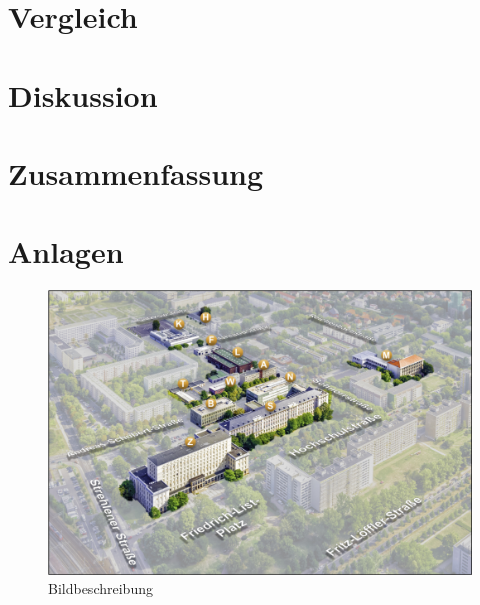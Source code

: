 \documentclass[
 openright,
 a4paper
]{scrreprt}
\begin{document}
\chapter{Vergleich}

\chapter{Diskussion}

\chapter{Zusammenfassung}

\nocite{*}
\printbibliography
{}

\appendix
\chapter*{Anlagen} \label{Anlagen}
\setcounter{chapter}{1} 

\begin{figure}[!ht]
\centering
\includegraphics[width=\textwidth]{Bilddatei}
\caption{Bildbeschreibung}
\label{fig:Bildlabel}
\end{figure}

\clearpage
\thispagestyle{empty}
\begin{center}
\vfill
\phantom{© \makeatletter\@author\makeatother}
\end{center}
\end{document}

